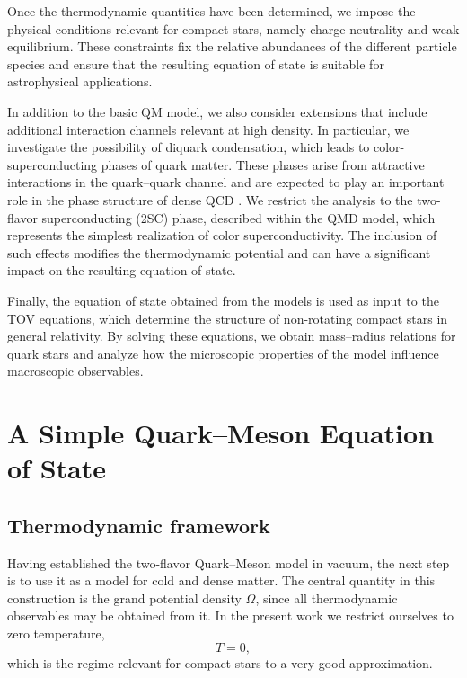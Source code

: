 Once the thermodynamic quantities have been determined, we impose the
physical conditions relevant for compact stars, namely charge
neutrality and weak equilibrium. These constraints fix the relative
abundances of the different particle species and ensure that the
resulting equation of state is suitable for astrophysical
applications.

In addition to the basic QM model, we also consider extensions that
include additional interaction channels relevant at high density. In
particular, we investigate the possibility of diquark condensation,
which leads to color-superconducting phases of quark matter. These
phases arise from attractive interactions in the quark--quark channel
and are expected to play an important role in the phase structure of
dense QCD \cite{Alford2008,Schmitt2010}. We restrict the analysis to
the two-flavor superconducting (2SC) phase, described within the
QMD model, which represents the
simplest realization of color superconductivity. The inclusion of such
effects modifies the thermodynamic potential and can have a
significant impact on the resulting equation of state.

Finally, the equation of state obtained from the models is used as
input to the TOV equations, which determine the structure of
non-rotating compact stars in general relativity. By solving these
equations, we obtain mass--radius relations for quark stars and
analyze how the microscopic properties of the model influence
macroscopic observables.

\section{A Simple Quark--Meson Equation of State}

\subsection*{Thermodynamic framework}

Having established the two-flavor Quark--Meson model in vacuum, the
next step is to use it as a model for cold and dense matter. The
central quantity in this construction is the grand potential density
$\Omega$, since all thermodynamic observables may be obtained from it.
In the present work we restrict ourselves to zero temperature,
\begin{equation}
T=0,
\end{equation}
which is the regime relevant for compact stars to a very good
approximation.

